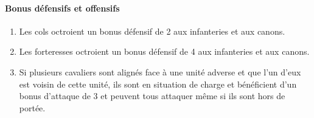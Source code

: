 		\paragraph{Bonus défensifs et offensifs}
		\begin{enumerate}
		\item Les cols octroient un bonus défensif de 2 aux infanteries et aux canons.
		\item Les forteresses octroient un bonus défensif de 4 aux infanteries et aux canons.
		\item Si plusieurs cavaliers sont alignés face à une unité adverse et que l'un d'eux est voisin de cette unité, ils sont en situation de charge et bénéficient d'un bonus d'attaque de 3 et peuvent tous attaquer même si ils sont hors de portée.
		\end{enumerate}
		
		\clearpage
